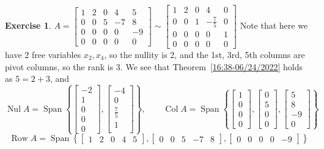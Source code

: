 \documentclass{beamer}
\DeclareMathOperator{\Nul}{Nul}
\DeclareMathOperator{\Col}{Col}
\DeclareMathOperator{\Row}{Row}
\theoremstyle{definition}
\newtheorem{exercise}[theorem]{Exercise}
\theoremstyle{remark}
\DeclareMathOperator{\Span}{Span}
\begin{document}
\begin{frame}[t]
\begin{exercise}
$A=\begin{bmatrix}
1&2&0&4&5\\
0&0&5&-7&8\\
0&0&0&0&-9\\
0&0&0&0&0
\end{bmatrix}\sim\begin{bmatrix}
1&2&0&4&0\\
0&0&1&-\frac{7}{5}&0\\
0&0&0&0&1\\
0&0&0&0&0
\end{bmatrix}$\pause
Note that here we have 2 free variables $x_2,x_4$, so the nullity is 2\pause, and the 1st, 3rd, 5th columns are pivot columns, so the rank is 3\pause. We see that Theorem~\ref{16:38-06/24/2022} holds as $5=2+3$\pause, and
\[
\Nul A=\Span\left\{\begin{bmatrix}
-2\\1\\0\\0\\0
\end{bmatrix},\begin{bmatrix}
-4\\0\\\frac{7}{5}\\1\\
\end{bmatrix}\right\},\qquad \Col A=\Span\left\{\begin{bmatrix}
1\\0\\0\\0
\end{bmatrix},\begin{bmatrix}
0\\5\\0\\0
\end{bmatrix},\begin{bmatrix}
5\\8\\-9\\0
\end{bmatrix}\right\}
\]\pause
\[
\Row A=\Span\left\{\begin{bmatrix}
1&2&0&4&5
\end{bmatrix},\begin{bmatrix}
0&0&5&-7&8
\end{bmatrix},\begin{bmatrix}
0&0&0&0&-9
\end{bmatrix}\right\}
\]
\end{exercise}
\end{frame}
\end{document}
